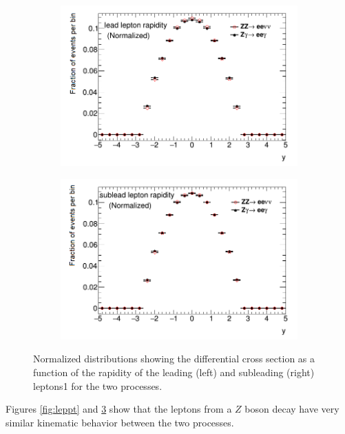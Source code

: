 \documentclass[12pt,a4paper,openright,twoside]{report}
\begin{document}
\begin{figure}[H]
\centering
	\begin{subfigure}{0.49\textwidth}
		\includegraphics[width=\linewidth]{leady.png}
		\caption{}
		\label{fig:leady}
	\end{subfigure}
	\begin{subfigure}{0.49\textwidth}
		\includegraphics[width=\linewidth]{subleady.png}
		\caption{}
		\label{fig:subleady}
	\end{subfigure}
	\caption{Normalized distributions showing the differential cross section as a function of the rapidity of the leading (left) and subleading (right) leptons1 for the two processes.}
	\label{fig:leptony}
\end{figure}

Figures \ref{fig:leppt} and \ref{fig:leptony} show that the leptons from a $Z$ boson decay have very similar kinematic behavior between the two processes.
\end{document}
